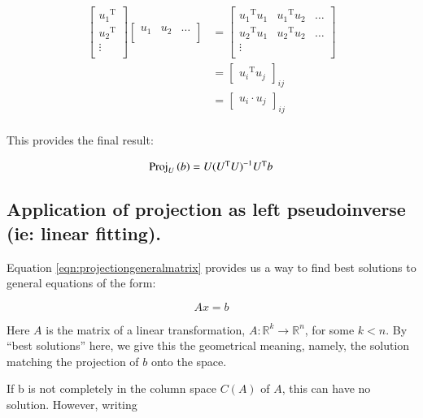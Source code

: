 \documentclass{article}      %
\DeclareMathOperator{\TextTranspose}{T}
\newcommand{\transpose}[1]{{{#1}^{\TextTranspose}}}
\begin{document}
\begin{align*}
\begin{bmatrix}
\transpose{u_1} \\
\transpose{u_2} \\
\vdots \\
\end{bmatrix}
\begin{bmatrix}
{u_1} & {u_2} & \hdots \\
\end{bmatrix}
&=
\begin{bmatrix}
\transpose{u_1} {u_1} & \transpose{u_1} {u_2} & \hdots \\
\transpose{u_2} {u_1} & \transpose{u_2} {u_2} & \hdots \\
\vdots & & \\
\end{bmatrix} \\
&=
{
\begin{bmatrix}
\transpose{u_i} {u_j}
\end{bmatrix}
}_{ij} \\
&=
{
\begin{bmatrix}
{u_i} \cdot {u_j}
\end{bmatrix}
}_{ij} \\
\end{align*}

This provides the final result:

\begin{equation}\label{eqn:projectiongeneralmatrix}
\Proj_{U}\left(b\right) = U (\transpose{U} U)^{-1} \transpose{U} b
\end{equation}

\subsection{ Application of projection as left pseudoinverse (ie: linear fitting). }

Equation \ref{eqn:projectiongeneralmatrix} provides us a way to find best solutions to general equations of the form:

\[
A x = b
\]

Here $A$ is the matrix of a linear transformation, $A : \mathbb{R}^k \rightarrow \mathbb{R}^n$, for some $k<n$.
By ``best solutions'' here, we give this the geometrical meaning, namely, the solution matching the projection of $b$ onto the space.

If b is not completely in the column space $C(A)$ of $A$, this can have no solution.  However, writing
\end{document}
